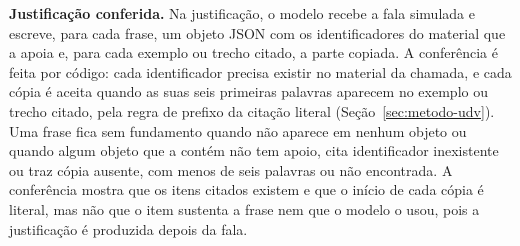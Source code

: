 \textbf{Justificação conferida.} Na justificação, o modelo recebe a fala simulada e escreve, para
cada frase, um objeto JSON com os identificadores do material que a apoia e, para cada exemplo ou
trecho citado, a parte copiada. A conferência é feita por código: cada identificador precisa existir
no material da chamada, e cada cópia é aceita quando as suas seis primeiras palavras aparecem no
exemplo ou trecho citado, pela regra de prefixo da citação literal (Seção~\ref{sec:metodo-udv}). Uma
frase fica sem fundamento quando não aparece em nenhum objeto ou quando algum objeto que a contém não
tem apoio, cita identificador inexistente ou traz cópia ausente, com menos de seis palavras ou não
encontrada. A conferência mostra que os itens citados existem e que o início de cada cópia é literal,
mas não que o item sustenta a frase nem que o modelo o usou, pois a justificação é produzida depois
da fala.
